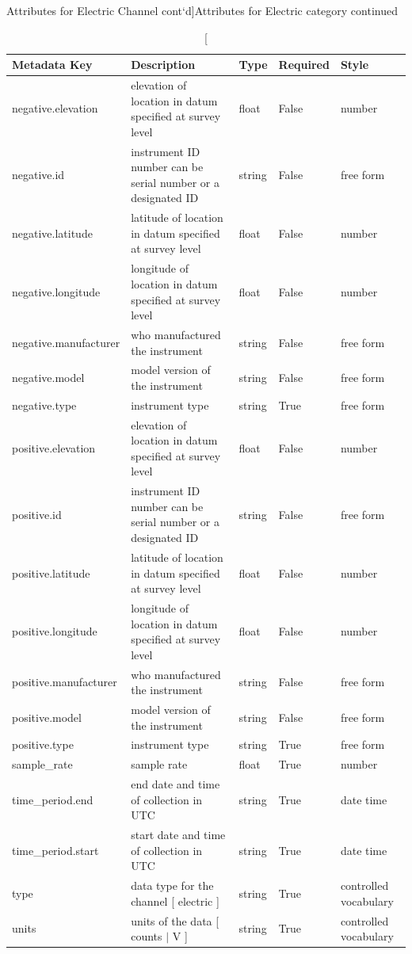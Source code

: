 \documentclass{article}
\begin{document}
\newpage
\begin{table}[h!]
    \caption[Attributes for Electric Channel cont`d]{Attributes for Electric category continued}
    \begin{tabular}{|l|p{2.75in}|l|l|p{.95in}|}
    	\hline
    	\textbf{Metadata Key} & \textbf{Description} & \textbf{Type} & \textbf{Required} & \textbf{Style}\\ \hline
   		negative.elevation & elevation of location in datum specified at survey level & float & False & number \\ \hline
    	negative.id & instrument ID number can be serial number or a designated ID & string & False & free form \\ \hline
    	negative.latitude & latitude of location in datum specified at survey level & float & False & number \\ \hline
    	negative.longitude & longitude of location in datum specified at survey level & float & False & number \\ \hline
    	negative.manufacturer & who manufactured the instrument & string & False & free form \\ \hline
    	negative.model & model version of the instrument & string & False & free form \\ \hline
    	negative.type & instrument type & string & True & free form \\ \hline
       	positive.elevation & elevation of location in datum specified at survey level & float & False & number \\ \hline
        positive.id & instrument ID number can be serial number or a designated ID & string & False & free form \\ \hline
        positive.latitude & latitude of location in datum specified at survey level & float & False & number \\ \hline
        positive.longitude & longitude of location in datum specified at survey level & float & False & number \\ \hline
        positive.manufacturer & who manufactured the instrument & string & False & free form \\ \hline
        positive.model & model version of the instrument & string & False & free form \\ \hline
        positive.type & instrument type & string & True & free form \\ \hline
        sample\_rate & sample rate & float & True & number \\ \hline
        time\_period.end & end date and time of collection in UTC & string & True & date time \\ \hline
        time\_period.start & start date and time of collection in UTC & string & True & date time \\ \hline
        type & data type for the channel [ electric ]& string & True & controlled vocabulary \\ \hline
        units & units of the data [ counts $|$ V ] & string & True & controlled vocabulary \\ \hline
        \end{tabular}
        \label{tab:electric02}
\end{table}    
\end{document}
